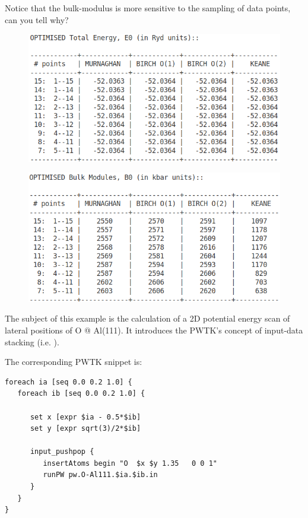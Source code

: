 \documentclass[landscape]{foils}
\begin{document}
Notice that the bulk-modulus is more sensitive to the sampling of
data points, can you tell why?
 
\begin{figure}
\centering
\includegraphics[width=15.0cm]{figs/TOTAL_ENERGY.png}
\end{figure}

\begin{figure}
\centering
\includegraphics[width=15.0cm]{figs/BULK_MODULES.png}
\end{figure}


The subject of this example is the calculation of a 2D potential
energy scan of lateral positions of O @ Al(111). It introduces the
PWTK's concept of input-data stacking (i.e. ).

The corresponding PWTK snippet is:
{\codecolor\small
\begin{verbatim}
foreach ia [seq 0.0 0.2 1.0] {
   foreach ib [seq 0.0 0.2 1.0] {

      set x [expr $ia - 0.5*$ib]
      set y [expr sqrt(3)/2*$ib]

      input_pushpop {
         insertAtoms begin "O  $x $y 1.35   0 0 1"
         runPW pw.O-Al111.$ia.$ib.in
      }
   }
}
\end{verbatim}
}
\end{document}
